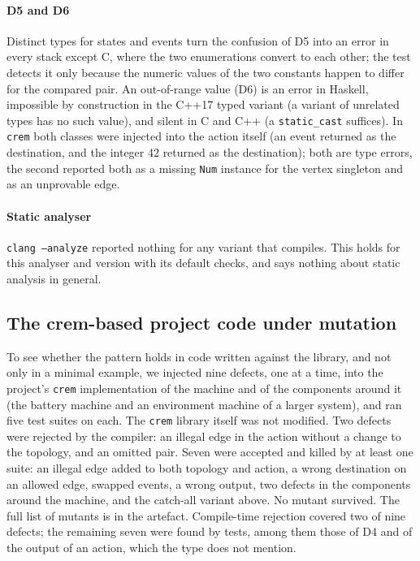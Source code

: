 \documentclass[review,12pt]{elsarticle}
\newcommand{\code}[1]{\texttt{#1}}
\newcommand{\crem}{\texttt{crem}}
\begin{document}
\paragraph{D5 and D6} Distinct types for states and events turn the confusion of D5 into an error in every stack except C, where the two enumerations convert to each other; the test detects it only because the numeric values of the two constants happen to differ for the compared pair. An out-of-range value (D6) is an error in Haskell, impossible by construction in the C++17 typed variant (a variant of unrelated types has no such value), and silent in C and C++ (a \code{static\_cast} suffices). In \crem{} both classes were injected into the action itself (an event returned as the destination, and the integer 42 returned as the destination); both are type errors, the second reported both as a missing \code{Num} instance for the vertex singleton and as an unprovable edge.

\paragraph{Static analyser} \code{clang --analyze} reported nothing for any variant that compiles. This holds for this analyser and version with its default checks, and says nothing about static analysis in general.

\subsection{The crem-based project code under mutation}
\label{sec:crem}

To see whether the pattern holds in code written against the library, and not only in a minimal example, we injected nine defects, one at a time, into the project's \crem{} implementation of the machine and of the components around it (the battery machine and an environment machine of a larger system), and ran five test suites on each. The \crem{} library itself was not modified. Two defects were rejected by the compiler: an illegal edge in the action without a change to the topology, and an omitted pair. Seven were accepted and killed by at least one suite: an illegal edge added to both topology and action, a wrong destination on an allowed edge, swapped events, a wrong output, two defects in the components around the machine, and the catch-all variant above. No mutant survived. The full list of mutants is in the artefact. Compile-time rejection covered two of nine defects; the remaining seven were found by tests, among them those of D4 and of the output of an action, which the type does not mention.
\end{document}
